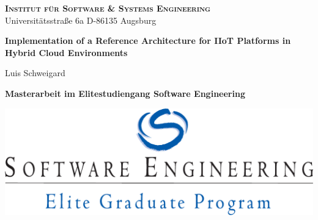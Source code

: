 \vspace{8mm}
\begin{center}
{\Large
    {\bfseries \scshape Institut für Software \& Systems Engineering} \\
    Universitätsstraße 6a \hspace{0.25cm} D-86135 Augsburg \\
}
\end{center}

\vspace{1cm}
\begin{center}
    {\Huge \bfseries Implementation of a Reference Architecture for IIoT Platforms in Hybrid Cloud Environments \\ }
\end{center}

\vspace{1.75cm}
\begin{center}
    {\Large Luis Schweigard}
\end{center}

\vspace{1cm}
\begin{center}
    {\Large \bfseries Masterarbeit im Elitestudiengang Software Engineering}
\end{center}

\vspace{1cm}
\begin{center}
    \includegraphics[width=.4\linewidth]{img/logos/LogoSEengl}
\end{center}
